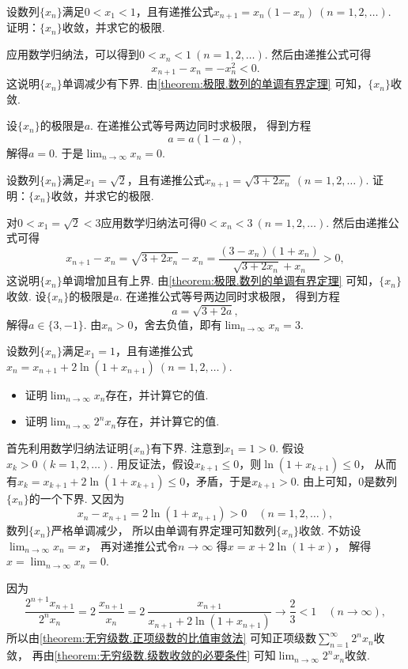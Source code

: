\begin{example}
设数列\(\{x_n\}\)满足\(0<x_1<1\)，且有递推公式\(x_{n+1}=x_n(1-x_n)\ (n=1,2,\dotsc)\).
证明：\(\{x_n\}\)收敛，并求它的极限.
\begin{solution}
应用数学归纳法，可以得到\(0<x_n<1\ (n=1,2,\dotsc)\).
然后由递推公式可得\[
	x_{n+1}-x_n = -x_n^2 < 0.
\]
这说明\(\{x_n\}\)单调减少有下界.
由\cref{theorem:极限.数列的单调有界定理} 可知，\(\{x_n\}\)收敛.

设\(\{x_n\}\)的极限是\(a\).
在递推公式等号两边同时求极限，
得到方程\[
	a=a(1-a),
\]
解得\(a=0\).
于是\(\lim_{n\to\infty} x_n = 0\).
\end{solution}
\end{example}

\begin{example}
设数列\(\{x_n\}\)满足\(x_1=\sqrt2\)，且有递推公式\(x_{n+1}=\sqrt{3+2x_n}\ (n=1,2,\dotsc)\).
证明：\(\{x_n\}\)收敛，并求它的极限.
\begin{solution}
对\(0<x_1=\sqrt2<3\)应用数学归纳法可得\(0<x_n<3\ (n=1,2,\dotsc)\).
然后由递推公式可得\[
	x_{n+1}-x_n = \sqrt{3+2x_n} - x_n
	= \frac{(3-x_n)(1+x_n)}{\sqrt{3+2x_n}+x_n}
	> 0,
\]
这说明\(\{x_n\}\)单调增加且有上界.
由\cref{theorem:极限.数列的单调有界定理} 可知，\(\{x_n\}\)收敛.
设\(\{x_n\}\)的极限是\(a\).
在递推公式等号两边同时求极限，
得到方程\[
	a=\sqrt{3+2a},
\]
解得\(a\in\{3,-1\}\).
由\(x_n>0\)，舍去负值，即有\(\lim_{n\to\infty} x_n = 3\).
\end{solution}
\end{example}

\begin{example}
设数列\(\{x_n\}\)满足\(x_1=1\)，且有递推公式\(x_n=x_{n+1}+2\ln(1+x_{n+1})\ (n=1,2,\dotsc)\).
\begin{itemize}
	\item 证明\(\lim_{n\to\infty} x_n\)存在，并计算它的值.
	\item 证明\(\lim_{n\to\infty} 2^n x_n\)存在，并计算它的值.
\end{itemize}
\begin{solution}
首先利用数学归纳法证明\(\{x_n\}\)有下界.
注意到\(x_1=1>0\).
假设\(x_k>0\ (k=1,2,\dotsc)\).
用反证法，假设\(x_{k+1}\leq0\)，则\(\ln(1+x_{k+1})\leq0\)，
从而有\(x_k=x_{k+1}+2\ln(1+x_{k+1})\leq0\)，矛盾，于是\(x_{k+1}>0\).
由上可知，\(0\)是数列\(\{x_n\}\)的一个下界.
又因为\[
	x_n-x_{n+1}=2\ln(1+x_{n+1})>0
	\quad(n=1,2,\dotsc),
\]
数列\(\{x_n\}\)严格单调减少，
所以由单调有界定理可知数列\(\{x_n\}\)收敛.
不妨设\(\lim_{n\to\infty} x_n = x\)，
再对递推公式令\(n\to\infty\)
得\(x=x+2\ln(1+x)\)，
解得\(x = \lim_{n\to\infty} x_n = 0\).

因为\[
	\frac{2^{n+1} x_{n+1}}{2^n x_n}
	= 2~\frac{x_{n+1}}{x_n} %
	= 2~\frac{x_{n+1}}{x_{n+1}+2\ln(1+x_{n+1})} %
	\to \frac23 < 1
	\quad(n\to\infty),
\]
所以由\cref{theorem:无穷级数.正项级数的比值审敛法}
可知正项级数\(\sum_{n=1}^\infty 2^n x_n\)收敛，
再由\cref{theorem:无穷级数.级数收敛的必要条件}
可知\(\lim_{n\to\infty} 2^n x_n\)收敛.
\end{solution}
\end{example}

